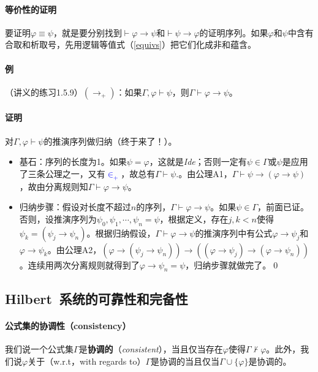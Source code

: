 \documentclass[b5paper,oneside]{ctexbook}
\newcommand{\Blue}[1]{\textcolor[named]{blue}{#1}}
\begin{document}
\paragraph{等价性的证明}要证明$\varphi\equiv\psi$，就是要分别找到$\vdash\varphi\to\psi$和$\vdash\psi\to\varphi$的证明序列。如果$\varphi$和$\psi$中含有合取和析取号，先用逻辑等值式（\ref{equivs}）把它们化成非和蕴含。
\paragraph{例}（讲义的练习1.5.9）$(\rightarrow_{+})$：如果$\Gamma, \varphi\vdash\psi$，则$\Gamma\vdash\varphi\rightarrow\psi$。
\paragraph{证明}对$\Gamma, \varphi\vdash\psi$的推演序列做归纳（终于来了！）。
\begin{itemize}
\item 基石：序列的长度为1。如果$\psi = \varphi$，这就是\textit{Ide}；否则一定有$\psi \in \Gamma$或$\psi$是应用了三条公理之一，又有\Blue{$\in_+$}，故总有$\Gamma\vdash \psi$.。由公理A1，$\Gamma\vdash \psi\rightarrow (\varphi\rightarrow\psi )$，故由分离规则知$\Gamma\vdash\varphi\rightarrow\psi$。
\item 归纳步骤：假设对长度不超过$n$的序列，$\Gamma\vdash\varphi\rightarrow\psi$。如果$\psi\in\Gamma$，前面已证。否则，设推演序列为$\psi_0,\psi_1,\cdots ,\psi_n=\psi$，根据定义，存在$j,k<n$使得$\psi_k=(\psi_j\rightarrow \psi_n)$。根据归纳假设，$\Gamma\vdash\varphi\rightarrow\psi$的推演序列中有公式$\varphi\rightarrow\psi_j$和$\varphi\rightarrow \psi_k$。由公理A2，$(\varphi\rightarrow (\psi_j\rightarrow\psi_n ))\rightarrow ((\varphi\rightarrow\psi_j)\rightarrow(\varphi\rightarrow\psi_n))$。连续用两次分离规则就得到了$\varphi\rightarrow \psi_n =\psi$，归纳步骤就做完了。\hfill\qed
\end{itemize}
\subsection{Hilbert~系统的可靠性和完备性}
\paragraph{公式集的协调性（consistency）}我们说一个公式集$\Gamma$是\textbf{协调的}（\textit{consistent}），当且仅当存在$\varphi$使得$\Gamma\not\vdash\varphi$。此外，我们说$\varphi$关于（w.r.t，with regards to）$\Gamma$是协调的当且仅当$\Gamma\cup\{\varphi\}$是协调的。\label{cons}
\end{document}
